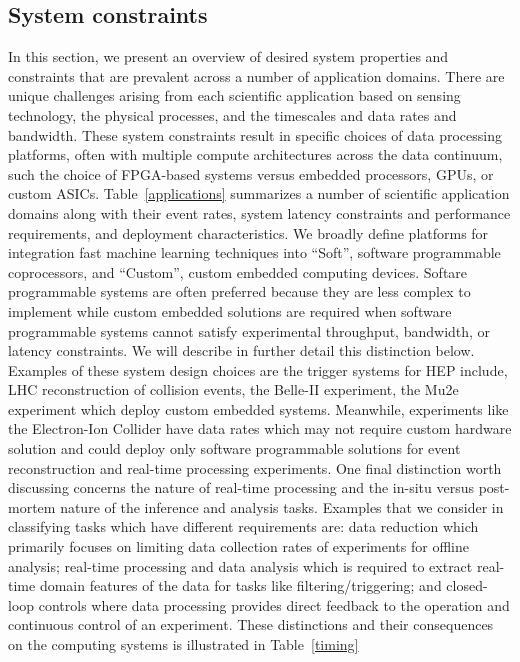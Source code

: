 \subsection{System constraints}
In this section, we present an overview of desired system properties and constraints that are prevalent across a number of application domains. 
There are unique challenges arising from each scientific application based on sensing technology, the physical processes, and the timescales and data rates and bandwidth.  
These system constraints result in specific choices of data processing platforms, often with multiple compute architectures across the data continuum, such the choice of FPGA-based systems versus embedded processors, GPUs, or custom ASICs. 
Table~\ref{applications} summarizes a number of scientific application domains along with their event rates, system latency constraints and performance requirements, and deployment characteristics. 
We broadly define platforms for integration fast machine learning techniques into ``Soft'', software programmable coprocessors, and ``Custom'', custom embedded computing devices.  Softare programmable systems are often preferred because they are less complex to implement while custom embedded solutions are required when software programmable systems cannot satisfy experimental throughput, bandwidth, or latency constraints.  
We will describe in further detail this distinction below.  
Examples of these system design choices are the trigger systems for HEP include, LHC reconstruction of collision events, the Belle-II experiment, the Mu2e experiment which deploy custom embedded systems. 
Meanwhile, experiments like the Electron-Ion Collider have data rates which may not require custom hardware solution and could deploy only software programmable solutions for event reconstruction and real-time processing experiments. %
One final distinction worth discussing concerns the nature of real-time processing and the in-situ versus post-mortem nature of the inference and analysis tasks. 
Examples that we consider in classifying tasks which have different requirements are: data reduction which primarily focuses on limiting data collection rates of experiments for offline analysis; real-time processing and data analysis which is required to extract real-time domain features of the data for tasks like filtering/triggering; and closed-loop controls where data processing provides direct feedback to the operation and continuous control of an experiment. 
These distinctions and their consequences on the computing systems is illustrated in Table~\ref{timing}  

